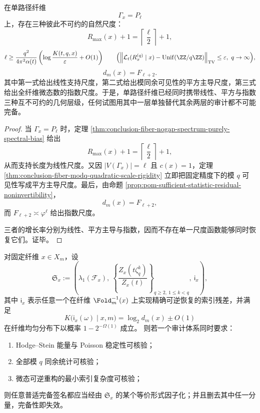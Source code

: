 \begin{theorem}\label{thm:conclusion-single-path-linear-quadratic-exponential-splitting}
在单路径纤维
\[
\Gamma_x=P_\ell
\]
上，存在三种彼此不可约的自然尺度：
\[
R_{\max}(x)+1
=
\left\lceil\frac{\ell}{2}\right\rceil+1,
\]
\[
\ell
\ge
\frac{q^2}{4\pi^2\alpha(t)}
\left(\log\frac{K(t,q,x)}{\varepsilon}+O(1)\right)
\qquad
\Bigl(\left\|\mathcal L_t(R_x^{(q)}\mid x)-\mathrm{Unif}(\ZZ/q\ZZ)\right\|_{\mathrm{TV}}\le\varepsilon,\ q\to\infty\Bigr),
\]
\[
d_m(x)=F_{\ell+2}.
\]
其中第一式给出线性支持尺度，第二式给出模同余可见性的平方主导尺度，第三式给出全纤维微态数的指数尺度。于是，单路径纤维已经同时携带线性、平方与指数三种互不可约的几何层级，任何试图用其中一层单独替代其余两层的审计都不可能完备。
\end{theorem}
\begin{proof}
当 \(\Gamma_x=P_\ell\) 时，定理 \ref{thm:conclusion-fiber-nogap-spectrum-purely-spectral-bias} 给出
\[
R_{\max}(x)+1=\left\lceil\frac{\ell}{2}\right\rceil+1,
\]
从而支持长度为线性尺度。又因 \(|V(\Gamma_x)|=\ell\) 且 \(c(x)=1\)，定理 \ref{thm:conclusion-fiber-modq-quadratic-scale-rigidity} 立即把固定精度下的模 \(q\) 可见性写成平方主导尺度。最后，由命题 \ref{prop:pom-sufficient-statistic-residual-noninvertibility}，
\[
d_m(x)=F_{\ell+2},
\]
而 \(F_{\ell+2}\asymp \varphi^\ell\) 给出指数尺度。

三者的增长率分别为线性、平方主导与指数，因而不存在单一尺度函数能够同时恢复它们。证毕。
\end{proof}

\begin{conjecture}[固定纤维的最小完备审计签名]\label{conj:conclusion-fiber-minimal-complete-audit-signature}
对固定纤维 \(x\in X_m\)，设
\[
\mathfrak S_x
:=
\left(
\lambda_1(\mathcal F_x),\
\left\{\frac{Z_x(t\zeta_q^k)}{Z_x(t)}\right\}_{q\ge 2,\ 1\le k<q},\
\mathsf i_x
\right),
\]
其中 \(\mathsf i_x\) 表示任意一个在纤维 \(\Fold_m^{-1}(x)\) 上实现精确可逆恢复的索引残差，并满足
\[
K\bigl(\mathsf i_x(\omega)\mid x,m\bigr)=\log_2 d_m(x)\pm O(1)
\]
在纤维均匀分布下以概率 \(1-2^{-\Omega(1)}\) 成立。
则若一个审计体系同时要求：
\begin{enumerate}
  \item Hodge--Stein 能量与 Poisson 稳定性可核验；
  \item 全部模 \(q\) 同余统计可核验；
  \item 微态可逆重构的最小索引复杂度可核验；
\end{enumerate}
则任意普适完备签名都应当经由 \(\mathfrak S_x\) 的某个等价形式因子化；并且删去其中任一分量，完备性即失效。
\end{conjecture}

